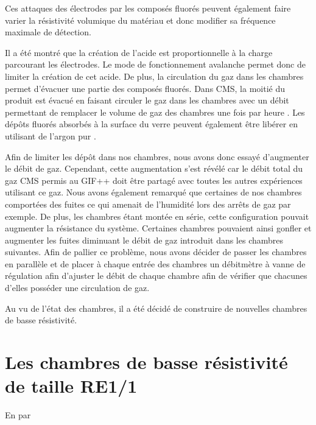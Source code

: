 Ces attaques des électrodes par les composés fluorés peuvent également faire varier la résistivité volumique du matériau et donc modifier sa fréquence maximale de détection.

Il a été montré que la création de l'acide  est proportionnelle à la charge parcourant les électrodes. Le mode de fonctionnement avalanche permet donc de limiter la création de cet acide. De plus, la circulation du gaz dans les chambres permet d'évacuer une partie des composés fluorés. Dans CMS, la moitié du  produit est évacué en faisant circuler le gaz dans les chambres avec un débit permettant de remplacer le volume de gaz des chambres une fois par heure \cite{Abbrescia:2006hk}. Les dépôts fluorés absorbés à la surface du verre peuvent également être libérer en utilisant de l'argon pur \cite{Band:2008zza}.

Afin de limiter les dépôt dans nos chambres, nous avons donc essayé d'augmenter le débit de gaz. Cependant, cette augmentation s'est révélé car le débit total du gaz CMS permis au GIF++ doit être partagé avec toutes les autres expériences utilisant ce gaz.
Nous avons également remarqué que certaines de nos chambres comportées des fuites ce qui amenait de l'humidité lors des arrêts de gaz par exemple. De plus, les chambres étant montée en série, cette configuration pouvait augmenter la résistance du système. Certaines chambres pouvaient ainsi gonfler et augmenter les fuites diminuant le débit de gaz introduit dans les chambres suivantes. Afin de pallier ce problème, nous avons décider de passer les chambres en parallèle et de placer à chaque entrée des chambres un débitmètre à vanne de régulation afin d'ajuster le débit de chaque chambre afin de vérifier que chacunes d'elles posséder une circulation de gaz.

Au vu de l'état des chambres, il a été décidé de construire de nouvelles chambres de basse résistivité.

\section{Les chambres de basse résistivité de taille RE1/1}
En par
